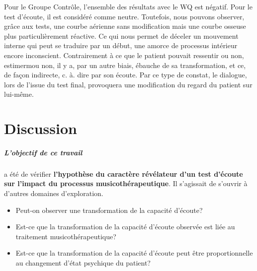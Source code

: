   
  Pour le Groupe Contrôle, l'ensemble des résultats avec le WQ est
  négatif. Pour le
  test d'écoute, il est considéré comme neutre. Toutefois, nous pouvons observer, grâce aux tests, une 
  courbe 
  aérienne
  sans modification mais une courbe osseuse plus
  particulièrement réactive. 
  Ce qui nous permet de déceler un mouvement interne qui peut se traduire par 
  un début, une amorce de
  processus intérieur encore inconscient. Contrairement à
  ce que le patient pouvait ressentir ou non, estimermou non, il y  a, par un autre biais, 
  ébauche de sa transformation, et ce, de façon indirecte, c. à. dire par son
  écoute. Par ce type de constat, le dialogue, lors de l'issue du test final,  provoquera une modification du 
  regard du patient sur lui-même.
 
\chapter{Discussion}
\label{Conclusions}



 
\paragraph{L'objectif de ce travail} a été de vérifier\textbf{ l'hypothèse du caractère
	révélateur d'un  test
	d'écoute}  \textbf{ sur l'impact du processus musicothérapeutique}.
Il s'agissait   
de s'ouvrir à d'autres
domaines d'exploration.


 


\begin{itemize}
	
	\item Peut-on observer une transformation de la capacité d'écoute?
	\item Est-ce que la transformation de la capacité d'écoute observée est liée
	au traitement musicothérapeutique?
	\item Est-ce que la transformation de la capacité d'écoute peut être proportionnelle au 
	changement d'état psychique du patient?
\end{itemize}


